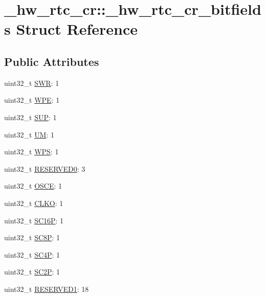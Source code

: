 \hypertarget{struct__hw__rtc__cr_1_1__hw__rtc__cr__bitfields}{}\section{\+\_\+hw\+\_\+rtc\+\_\+cr\+:\+:\+\_\+hw\+\_\+rtc\+\_\+cr\+\_\+bitfields Struct Reference}
\label{struct__hw__rtc__cr_1_1__hw__rtc__cr__bitfields}
\subsection*{Public Attributes}
\begin{DoxyCompactItemize}
\item 
uint32\+\_\+t \hyperlink{struct__hw__rtc__cr_1_1__hw__rtc__cr__bitfields_aec2a155b2f48eec64efc59895b1990be}{S\+WR}\+: 1
\item 
uint32\+\_\+t \hyperlink{struct__hw__rtc__cr_1_1__hw__rtc__cr__bitfields_ab90a9a6e0ca418fedaf6776edd140bfd}{W\+PE}\+: 1
\item 
uint32\+\_\+t \hyperlink{struct__hw__rtc__cr_1_1__hw__rtc__cr__bitfields_a7af7d1ad1bac5039bbb368d3648e26b4}{S\+UP}\+: 1
\item 
uint32\+\_\+t \hyperlink{struct__hw__rtc__cr_1_1__hw__rtc__cr__bitfields_a6622ff8ce84a75c0c3fb20b40d2b55f0}{UM}\+: 1
\item 
uint32\+\_\+t \hyperlink{struct__hw__rtc__cr_1_1__hw__rtc__cr__bitfields_a83df9924852ad443486c194fc49ef28f}{W\+PS}\+: 1
\item 
uint32\+\_\+t \hyperlink{struct__hw__rtc__cr_1_1__hw__rtc__cr__bitfields_adba5a30ca5550dc9f7636cd0b40e6153}{R\+E\+S\+E\+R\+V\+E\+D0}\+: 3
\item 
uint32\+\_\+t \hyperlink{struct__hw__rtc__cr_1_1__hw__rtc__cr__bitfields_ab2a94aef34e6a78b34ab968986a31f27}{O\+S\+CE}\+: 1
\item 
uint32\+\_\+t \hyperlink{struct__hw__rtc__cr_1_1__hw__rtc__cr__bitfields_ab5ccd1ae50218c6670a4e387fec04da2}{C\+L\+KO}\+: 1
\item 
uint32\+\_\+t \hyperlink{struct__hw__rtc__cr_1_1__hw__rtc__cr__bitfields_a38e0f3133b1185dda33a2dc1fe191f44}{S\+C16P}\+: 1
\item 
uint32\+\_\+t \hyperlink{struct__hw__rtc__cr_1_1__hw__rtc__cr__bitfields_a8915f6cfda9fc867c19274d7b9135704}{S\+C8P}\+: 1
\item 
uint32\+\_\+t \hyperlink{struct__hw__rtc__cr_1_1__hw__rtc__cr__bitfields_affec35fb5f9408746b88efc8d5206983}{S\+C4P}\+: 1
\item 
uint32\+\_\+t \hyperlink{struct__hw__rtc__cr_1_1__hw__rtc__cr__bitfields_a3d8ad5c254b7c5c0c84e8335c3948a03}{S\+C2P}\+: 1
\item 
uint32\+\_\+t \hyperlink{struct__hw__rtc__cr_1_1__hw__rtc__cr__bitfields_af5a8a16c0fba3a1233eca4b958ad4aa0}{R\+E\+S\+E\+R\+V\+E\+D1}\+: 18
\end{DoxyCompactItemize}


